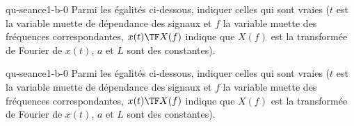 \begin{questionmult}{qu-seance1-b-0}
  Parmi les égalités ci-dessous, indiquer celles qui sont vraies
  ($t$ est la variable muette de dépendance des signaux et $f$ la
  variable muette des fréquences correspondantes, $x(t) \TF X(f)$
  indique que $X(f)$ est la transformée de Fourier de $x(t)$, $a$ et
  $L$ sont des constantes).
  \begin{reponses}
  \end{reponses}
\end{questionmult}
\begin{questionmult}{qu-seance1-b-0}
  Parmi les égalités ci-dessous, indiquer celles qui sont vraies
  ($t$ est la variable muette de dépendance des signaux et $f$ la
  variable muette des fréquences correspondantes, $x(t) \TF X(f)$
  indique que $X(f)$ est la transformée de Fourier de $x(t)$, $a$ et
  $L$ sont des constantes).
  \begin{reponses}
  \end{reponses}
\end{questionmult}
